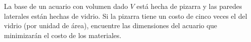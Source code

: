 \item La base de un acuario con volumen dado $V$ está hecha de pizarra y las paredes laterales están hechas de vidrio. Si la pizarra tiene un costo de cinco veces el del vidrio (por unidad de área), encuentre las dimensiones del acuario que minimizarán el costo de los materiales.
